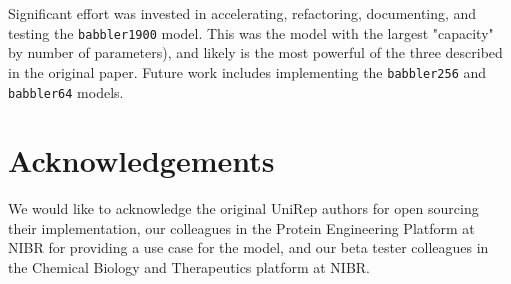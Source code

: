 \documentclass{bioinfo}
\begin{document}
Significant effort was invested in accelerating, refactoring, documenting,
and testing the \verb|babbler1900| model.
This was the model with the largest "capacity" by number of parameters),
and likely is the most powerful of the three described in the original paper.
Future work includes implementing
the \verb|babbler256| and \verb|babbler64| models.

\section{Acknowledgements}

We would like to acknowledge the original UniRep authors
for open sourcing their implementation,
our colleagues in the Protein Engineering Platform at NIBR
for providing a use case for the model,
and our beta tester colleagues
in the Chemical Biology and Therapeutics platform at NIBR.



\end{document}
